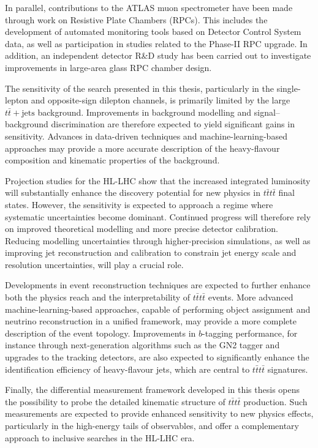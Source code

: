 In parallel, contributions to the ATLAS muon spectrometer have been made through work on Resistive Plate Chambers (RPCs). 
This includes the development of automated monitoring tools based on Detector Control System data, 
as well as participation in studies related to the Phase-II RPC upgrade. 
In addition, an independent detector R\&D study has been carried out to investigate improvements 
in large-area glass RPC chamber design.

The sensitivity of the search presented in this thesis, particularly in the single-lepton and opposite-sign dilepton channels, is primarily limited by the large $t\bar{t}+\mathrm{jets}$ background. 
Improvements in background modelling and signal--background discrimination are therefore expected to yield significant gains in sensitivity. 
Advances in data-driven techniques and machine-learning-based approaches may provide a more accurate description of the heavy-flavour composition and kinematic properties of the background.

Projection studies for the HL-LHC show that the increased integrated luminosity will substantially enhance the discovery potential for new physics in $t\bar{t}t\bar{t}$ final states. 
However, the sensitivity is expected to approach a regime where systematic uncertainties become dominant. 
Continued progress will therefore rely on improved theoretical modelling and more precise detector calibration. 
Reducing modelling uncertainties through higher-precision simulations, as well as improving jet reconstruction and calibration to constrain jet energy scale and resolution uncertainties, will play a crucial role.

Developments in event reconstruction techniques are expected to further enhance both the physics reach and the interpretability of $t\bar{t}t\bar{t}$ events. 
More advanced machine-learning-based approaches, capable of performing object assignment and neutrino reconstruction in a unified framework, may provide a more complete description of the event topology. 
Improvements in $b$-tagging performance, for instance through next-generation algorithms such as the GN2 tagger and upgrades to the tracking detectors, are also expected to significantly enhance the identification efficiency of heavy-flavour jets, which are central to $t\bar{t}t\bar{t}$ signatures.

Finally, the differential measurement framework developed in this thesis opens the possibility to probe the detailed kinematic structure of $t\bar{t}t\bar{t}$ production. 
Such measurements are expected to provide enhanced sensitivity to new physics effects, particularly in the high-energy tails of observables, and offer a complementary approach to inclusive searches in the HL-LHC era.